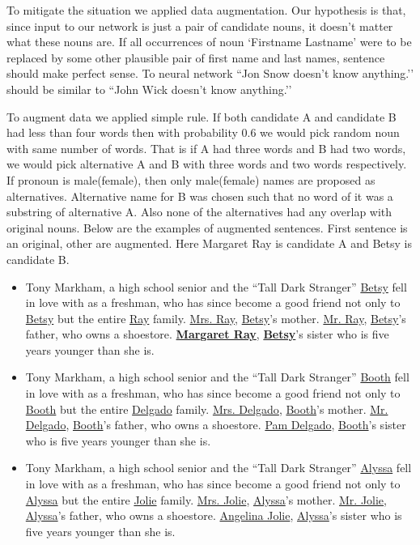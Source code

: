 \documentclass[11pt,a4paper]{article}
\begin{document}
To mitigate the situation we applied data augmentation. Our hypothesis is that, since input to our network is just a pair of candidate nouns, it doesn’t matter what these nouns are. If all occurrences of noun `Firstname Lastname’ were to be replaced by some other plausible pair of first name and last names, sentence should make perfect sense. To neural network ``Jon Snow doesn’t know anything.’’ should be similar to ``John Wick doesn’t know anything.’’ 

To augment data we applied simple rule. If both candidate A and candidate B had less than four words then with probability 0.6 we would pick random noun with same number of words. That is if A had three words and B had two words, we would pick alternative A and B with three words and two words respectively. If pronoun is male(female), then only male(female) names are proposed as alternatives. Alternative name for B was chosen such that no word of it was a substring of alternative A. Also none of the alternatives had any overlap with original nouns. Below are the examples of augmented sentences. First sentence is an original, other are augmented. Here Margaret Ray is candidate A and Betsy is candidate B.

\begin{itemize}
\item Tony Markham, a high school senior and the ``Tall Dark Stranger'' \underline{Betsy} fell in love with as a freshman, who has since become a good friend not only to \underline{Betsy} but the entire \underline{Ray} family. \underline{Mrs. Ray}, \underline{Betsy}'s mother. \underline{Mr. Ray}, \underline{Betsy}'s father, who owns a shoestore. \textbf{\underline{Margaret Ray}}, \textbf{\underline{Betsy}}'s sister who is five years younger than she is.
  
\item Tony Markham, a high school senior and the ``Tall Dark Stranger'' \underline{Booth} fell in love with as a freshman, who has since become a good friend not only to \underline{Booth} but the entire \underline{Delgado} family. \underline{Mrs. Delgado}, \underline{Booth}'s mother. \underline{Mr. Delgado}, \underline{Booth}'s father, who owns a shoestore. \underline{Pam Delgado}, \underline{Booth}'s sister who is five years younger than she is.

\item Tony Markham, a high school senior and the ``Tall Dark Stranger'' \underline{Alyssa} fell in love with as a freshman, who has since become a good friend not only to \underline{Alyssa} but the entire \underline{Jolie} family. \underline{Mrs. Jolie}, \underline{Alyssa}'s mother. \underline{Mr. Jolie}, \underline{Alyssa}'s father, who owns a shoestore. \underline{Angelina Jolie}, \underline{Alyssa}'s sister who is five years younger than she is.
\end{itemize}
\end{document}
